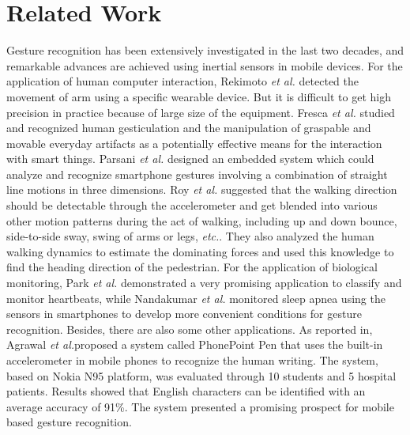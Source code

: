 \documentclass[review]{elsarticle}
\newcommand{\etal}{\textit{et al.}}
\begin{document}
\section{Related Work}\label{sec:relatedwork}
 {Gesture recognition has been extensively investigated in the last two decades, and remarkable advances are achieved using inertial sensors in mobile devices\;\cite{rekimoto2001iswc,jang2003signal,kallio2003online,bulling2014a}. For the application of human computer interaction, Rekimoto \etal\;\cite{rekimoto2001iswc} detected the movement of arm using a specific wearable device. But it is difficult to get high precision in practice because of large size of the equipment. Fresca \etal \;\cite{ferscha2007gestural} studied and recognized human gesticulation and the manipulation of graspable and movable everyday artifacts as a potentially effective means for the interaction with smart things. Parsani \etal \;\cite{Parsani2009A} designed an embedded system which could analyze and recognize smartphone gestures involving a combination of straight line motions in three dimensions. Roy \etal \;\cite{Roy2014Demo} suggested that the walking direction should be detectable through the accelerometer and get blended into various other motion patterns during the act of walking, including up and down bounce, side-to-side sway, swing of arms or legs, \emph{etc.}. They also analyzed the human walking dynamics to estimate the dominating forces and used this knowledge to find the heading direction of the pedestrian. For the application of biological monitoring, Park \etal\;\cite{Park2014Poster} demonstrated a very promising application to classify and monitor heartbeats, while Nandakumar \etal \;\cite{Nandakumar2015Contactless} monitored sleep apnea using the sensors in smartphones to develop more convenient conditions for gesture recognition\;\cite{hoang2013adaptive}. Besides, there are also some other applications.} As reported in\;\cite{Agrawal2011Using}, Agrawal \etal  proposed a system called PhonePoint Pen that uses the built-in accelerometer in mobile phones to recognize the human writing. The system, based on Nokia N95 platform, was evaluated through 10 students and 5 hospital patients. Results showed that English characters can be identified with an average accuracy of 91\%. The system presented a promising prospect for mobile based gesture recognition.
\end{document}

